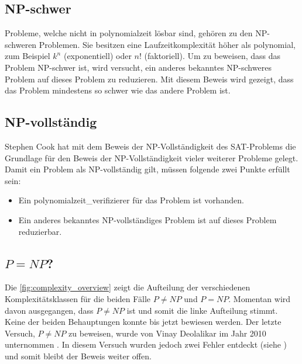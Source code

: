 \subsection{NP-schwer}\label{np_hard}
Probleme, welche nicht in \gls{polynomialzeit} lösbar sind, gehören zu den NP-schweren Problemen. Sie besitzen eine Laufzeitkomplexität höher als polynomial, zum Beispiel 
$k^n$ (exponentiell) oder $n!$ (faktoriell). Um zu beweisen, dass das Problem NP-schwer ist, wird versucht, ein anderes bekanntes NP-schweres Problem auf dieses Problem zu reduzieren. Mit 
diesem Beweis wird gezeigt, dass das Problem mindestens so schwer wie das andere Problem ist.

\subsection{NP-vollständig}\label{np_complet}
Stephen Cook hat mit dem Beweis der NP-Vollständigkeit des SAT-Problems \cite{cook_complexity} die Grundlage für den Beweis der NP-Vollständigkeit vieler weiterer Probleme 
gelegt. Damit ein Problem als NP-vollständig gilt, müssen folgende zwei Punkte erfüllt sein:
\begin{itemize}
	\item Ein \gls{polynomialzeit_verifizierer} für das Problem ist vorhanden.
	\item Ein anderes bekanntes NP-vollständiges Problem ist auf dieses Problem reduzierbar.
\end{itemize}

\subsection{$P = NP$?}
Die \autoref{fig:complexity_overview} zeigt die Aufteilung der verschiedenen Komplexitätsklassen für die beiden Fälle $P \neq NP$ und $P=NP$. Momentan wird davon ausgegangen, 
dass $P \neq NP$ ist und somit die linke Aufteilung stimmt. Keine der beiden Behauptungen konnte bis jetzt bewiesen werden. Der letzte Versuch, $P \neq NP$ zu beweisen, wurde von 
Vinay Deolalikar im Jahr 2010 unternommen \cite{p_neq_np_paper}. In diesem Versuch wurden jedoch zwei Fehler entdeckt (siehe \cite{p_neq_np_paper_blog}) und somit bleibt der 
Beweis weiter offen.

